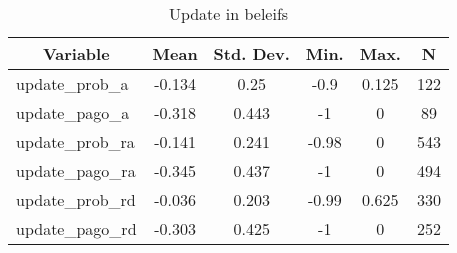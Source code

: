 
\begin{table}[htbp]\centering \caption{Update in beleifs \label{sumstat}}
\begin{tabular}{l c c c c c}\hline\hline
\multicolumn{1}{c}{\textbf{Variable}} & \textbf{Mean}
 & \textbf{Std. Dev.}& \textbf{Min.} &  \textbf{Max.} & \textbf{N}\\ \hline
update\_prob\_a & -0.134 & 0.25 & -0.9 & 0.125 & 122\\
update\_pago\_a & -0.318 & 0.443 & -1 & 0 & 89\\
update\_prob\_ra & -0.141 & 0.241 & -0.98 & 0 & 543\\
update\_pago\_ra & -0.345 & 0.437 & -1 & 0 & 494\\
update\_prob\_rd & -0.036 & 0.203 & -0.99 & 0.625 & 330\\
update\_pago\_rd & -0.303 & 0.425 & -1 & 0 & 252\\
\hline\end{tabular}
\end{table}

